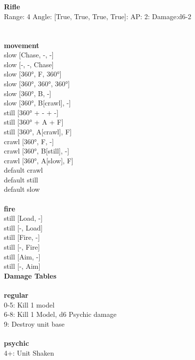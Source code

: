 \ \\

\ \\
{\bf Rifle } \\



Range: 4  Angle: [True, True, True, True]: AP: 2: Damage:d6-2 \\




 
\ \\




\ \\ {\bf movement } \\
slow [Chase, -, -] \\
slow [-, -, Chase] \\
slow [360°, F, 360°] \\
slow [360°, 360°, 360°] \\
slow [360°, B, -] \\
slow [360°, B[crawl], -] \\
still [360° + - + -] \\
still [360° + A + F] \\
still [360°, A[crawl], F] \\
crawl [360°, F, -] \\
crawl [360°, B[still], -] \\
crawl [360°, A[slow], F] \\
default crawl \\
default still \\
default slow \\
\ \\ {\bf fire } \\
still [Load, -] \\
still [-, Load] \\
still [Fire, -] \\
still [-, Fire] \\
still [Aim, -] \\
still [-, Aim] \\


{\bf Damage Tables} \\
\ \\ {\bf regular } \\
0-5: Kill 1 model \\
6-8: Kill 1 Model, d6 Psychic damage \\
9: Destroy unit base \\
\ \\ {\bf psychic } \\
4+: Unit Shaken \\










